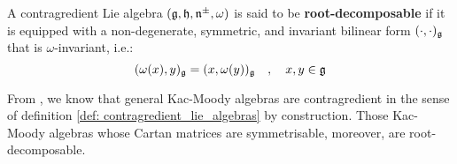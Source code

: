         \begin{definition} \label{def: root_decomposable_lie_algebras}
            A contragredient Lie algebra $(\mathfrak{g}, \mathfrak{h}, \mathfrak{n}^{\pm}, \omega)$ is said to be \textbf{root-decomposable} if it is equipped with a non-degenerate, symmetric, and invariant bilinear form $(\cdot, \cdot)_{\mathfrak{g}}$ that is $\omega$-invariant, i.e.:
                \begin{equation} \label{equation: cartan_invariant_pairing_on_root_decomposable_lie_algebras}
                    (\omega(x), y)_{\mathfrak{g}} = (x, \omega(y))_{\mathfrak{g}} \quad, \quad x, y \in \mathfrak{g}
                \end{equation}
        \end{definition}
        \begin{example}
            From \cite[Theorem 1.2 and Lemma 3.2]{kac_infinite_dimensional_lie_algebras}, we know that general Kac-Moody algebras are contragredient in the sense of definition \ref{def: contragredient_lie_algebras} by construction. Those Kac-Moody algebras whose Cartan matrices are symmetrisable, moreover, are root-decomposable.
            

\end{example}
